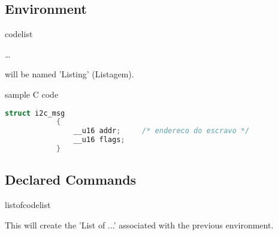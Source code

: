 \documentclass[dctools,english,tocdepth=3,secdepth=3]{ufrgscca} %
\newif\iffulldoc
\begin{document}
\subsection{Environment}
\begin{Envs}{codelist}
	\begin{Syntax}%
		\Macro{\begin{codelist}}{}\ldots \Macro{\end{codelist}}{}
	\end{Syntax}
\Macro{\caption}{} will be named 'Listing' (Listagem).

\begin{stcode}[st=d.listing]
	\begin{codelist}[htbp]
		\caption{sample C code}
		\label{code01}
		\begin{lstlisting}[language=C]
			struct i2c_msg
			{
				__u16 addr;     /* endereco do escravo */
				__u16 flags;
			}
		\end{lstlisting}
		{\sourcecitation{\textcite{Garg:SMA-2000}}}
	\end{codelist}
\end{stcode}

\end{Envs}

\subsection{Declared Commands}
\begin{Macros}{listofcodelist}
	\begin{Syntax}%
		\Macro{\listofcodelist}{}
	\end{Syntax}
This will create the 'List of ...' associated with the previous environment.
\end{Macros}

\iffulldoc

\begin{Macros}{\DeclareNewFloat}
	\begin{Syntax}%
		\Macro{\DeclareNewFloat}{env-name,file-ext,listname,listofname}
	\end{Syntax}
A new float environment, named \Env{env-name}, will be created. Captions will be associated (numbered) as \textbf{\Arg{listname} num:}. Finally, an associated command \Macro{\listof...}{} will be defined, using \Arg{listofname} as a numberless \Macro{\chapter}{} title.

\begin{stcode}[st=d.float]
	\def\listingname{Listing}%
	\def\listlistingname{List of Listings}%
	\DeclareNewFloat{codelist}{lox}{\listingname}{\listlistingname}%
 	\listofcodelist
\end{stcode}

\DisplayCode[emph={codelist,listofcodelist}]{d.float}
\end{Macros}
\fi
\end{document}
